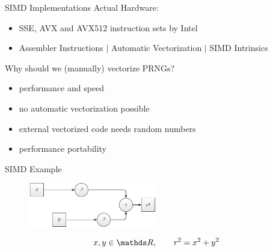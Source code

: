 \documentclass[aspectratio=169]{beamer}
\begin{document}
    \begin{frame}{SIMD Implementations}
      Actual Hardware:
      \begin{itemize}
        \pause
        \item SSE, AVX and AVX512 instruction sets by Intel
        \pause
        \item Assembler Instructions $|$ Automatic Vectorization $|$ SIMD Intrinsics
      \end{itemize}
      \bigskip
      \pause
      Why should we (manually) vectorize PRNGs?
      \begin{itemize}
        \pause
        \item performance and speed
        \pause
        \item no automatic vectorization possible
        \pause
        \item external vectorized code needs random numbers
        \pause
        \item performance portability
      \end{itemize}
    \end{frame}


    \begin{frame}{SIMD Example}
      \begin{figure}
        \includegraphics[width=0.5\textwidth]{figures/radius_operation.pdf}
      \end{figure}
      \begin{mybox}
        \[
          x,y\in\setReal, \qquad r^2 = x^2 + y^2
        \]
      \end{mybox}
    \end{frame}
\end{document}
